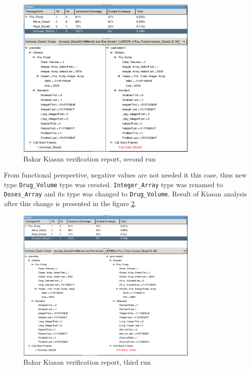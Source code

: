 \begin{figure}[ht]%
    \begin{center}
        \includegraphics[width=0.8\textwidth]{figures/pca-pump-verification-step2.png}        
    \end{center}
    \caption{Bakar Kiasan verification report, second run}
    \label{figure:sparkverification:kiasanreport2}
\end{figure}

From functional perspective, negative values are not needed it this case, thus new type \lstinline{Drug_Volume} type was created. \lstinline{Integer_Array} type was renamed to \lstinline{Doses_Array} and its type was changed to \lstinline{Drug_Volume}. Result of Kiasan analysis after this change is presented in the figure \ref{figure:sparkverification:kiasanreport3}.

\begin{figure}[ht]%
    \begin{center}
        \includegraphics[width=0.8\textwidth]{figures/pca-pump-verification-step3.png}        
    \end{center}
    \caption{Bakar Kiasan verification report, third run}
    \label{figure:sparkverification:kiasanreport3}
\end{figure}

